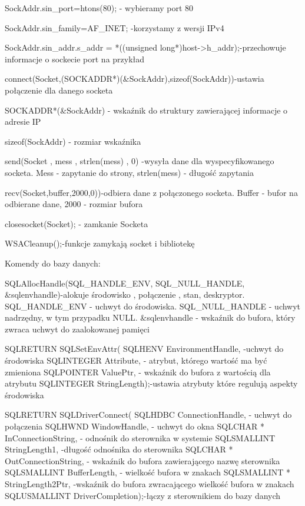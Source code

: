 \documentclass[a4paper,twoside,12pt]{mgr}
\begin{document}
    SockAddr.sin\_port=htons(80); - wybieramy port 80
    
    SockAddr.sin\_family=AF\_INET; -korzystamy z wersji IPv4
    
    SockAddr.sin\_addr.s\_addr = *((unsigned long*)host->h\_addr);-przechowuje informacje o sockecie port na przykład
    
    connect(Socket,(SOCKADDR*)(\&SockAddr),sizeof(SockAddr))-ustawia połączenie dla danego socketa
    
    SOCKADDR*(\&SockAddr) - wskaźnik do struktury zawierającej informacje o adresie IP
    
    sizeof(SockAddr) - rozmiar wskaźnika
    
    send(Socket , mess , strlen(mess) , 0) -wysyła dane dla wyspecyfikowanego socketa. Mess - zapytanie do strony, strlen(mess) - długość zapytania
    
    recv(Socket,buffer,2000,0))-odbiera dane z połączonego socketa. Buffer - bufor na odbierane dane, 2000 - rozmiar bufora
    
    closesocket(Socket); - zamkanie Socketa
    
        WSACleanup();-funkcje zamykają socket i bibliotekę
        
  Komendy do bazy danych:
 
 SQLAllocHandle(SQL\_HANDLE\_ENV, SQL\_NULL\_HANDLE, \&sqlenvhandle)-alokuje środowisko , połączenie , stan, deskryptor. SQL\_HANDLE\_ENV - uchwyt do środowiska. SQL\_NULL\_HANDLE - uchwyt nadrzędny, w tym przypadku NULL. \&sqlenvhandle - wskaźnik do bufora, który zwraca uchwyt do zaalokowanej pamięci
 
   SQLRETURN SQLSetEnvAttr(
     SQLHENV      EnvironmentHandle, -uchwyt do środowiska
     SQLINTEGER   Attribute, - atrybut, którego wartość ma być zmieniona
     SQLPOINTER   ValuePtr, - wskaźnik do bufora z wartością dla atrybutu
     SQLINTEGER   StringLength);-ustawia atrybuty które regulują aspekty środowiska
     
    SQLRETURN SQLDriverConnect(
     SQLHDBC         ConnectionHandle, - uchwyt do połączenia
     SQLHWND         WindowHandle, - uchwyt do okna
     SQLCHAR *       InConnectionString, - odnośnik do sterownika w systemie
     SQLSMALLINT     StringLength1, -długość odnośnika do sterownika
     SQLCHAR *       OutConnectionString, - wskaźnik do bufora zawierającego nazwę sterownika
     SQLSMALLINT     BufferLength, - wielkość bufora w znakach
     SQLSMALLINT *   StringLength2Ptr, -wskaźnik do bufora zwracającego wielkość bufora w znakach
     SQLUSMALLINT    DriverCompletion);-łączy z sterownikiem do bazy danych
     
\end{document}

